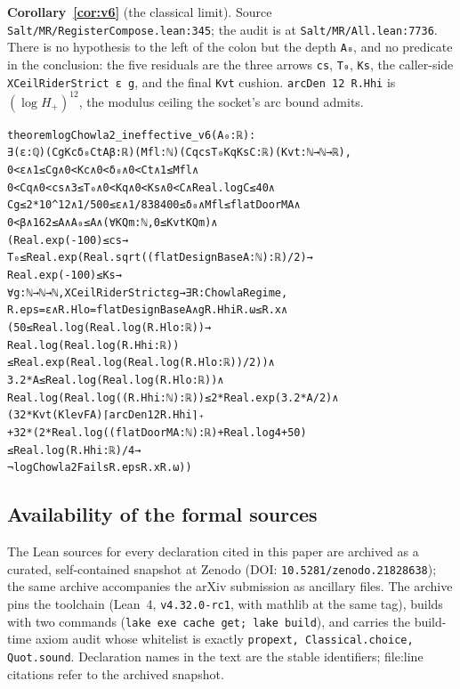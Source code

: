 \documentclass[11pt]{amsart}
\newcommand{\leaninline}[1]{{\small\texttt{#1}}}
\theoremstyle{remark}
\begin{document}
\medskip\noindent\textbf{Corollary~\ref{cor:v6}} (the classical limit). Source
\leaninline{Salt/\allowbreak MR/\allowbreak RegisterCompose.lean:345}; the audit is at
\leaninline{Salt/\allowbreak MR/\allowbreak All.lean:7736}. There is no hypothesis to the left of the
colon but the depth \leaninline{A₀}, and no predicate in the conclusion: the
five residuals are the three arrows \leaninline{cs}, \leaninline{T₀},
\leaninline{Ks}, the caller-side \leaninline{XCeilRiderStrict ε g}, and the
final \leaninline{Kvt} cushion. \leaninline{arcDen 12 R.Hhi} is
$(\log H_+)^{12}$, the modulus ceiling the socket's arc bound admits.
{\footnotesize\begin{alltt}
theorem logChowla2_ineffective_v6 (A₀ : ℝ) :
    ∃ (ε : ℚ) (Cg Kc δ₀ Ct A β : ℝ) (Mfl : ℕ) (Cq cs T₀ Kq Ks C : ℝ) (Kvt : ℕ → ℕ → ℝ),
      0 < ε ∧ 1 ≤ Cg ∧ 0 < Kc ∧ 0 < δ₀ ∧ 0 < Ct ∧ 1 ≤ Mfl ∧
      0 < Cq ∧ 0 < cs ∧ 3 ≤ T₀ ∧ 0 < Kq ∧ 0 < Ks ∧ 0 < C ∧ Real.log C ≤ 40 ∧
      Cg ≤ 2 * 10 ^ 12 ∧ 1 / 500 ≤ ε ∧ 1 / 838400 ≤ δ₀ ∧ Mfl ≤ flatDoorM A ∧
      0 < β ∧ 162 ≤ A ∧ A₀ ≤ A ∧ (∀ K Qm : ℕ, 0 ≤ Kvt K Qm) ∧
      (Real.exp (-100) ≤ cs →
        T₀ ≤ Real.exp (Real.sqrt ((flatDesignBase A : ℕ) : ℝ) / 2) →
        Real.exp (-100) ≤ Ks →
        ∀ g : ℕ → ℕ → ℕ, XCeilRiderStrict ε g → ∃ R : ChowlaRegime,
          R.eps = ε ∧ R.Hlo = flatDesignBase A ∧ g R.Hhi R.ω ≤ R.x ∧
          (50 ≤ Real.log (Real.log (R.Hlo : ℝ)) →
            Real.log (Real.log (R.Hhi : ℝ))
              ≤ Real.exp (Real.log (Real.log (R.Hlo : ℝ)) / 2)) ∧
          3.2 * A ≤ Real.log (Real.log (R.Hlo : ℝ)) ∧
          Real.log (Real.log ((R.Hhi : ℕ) : ℝ)) ≤ 2 * Real.exp (3.2 * A / 2) ∧
          (32 * Kvt (KlevF A) ⌈arcDen 12 R.Hhi⌉₊
              + 32 * (2 * Real.log ((flatDoorM A : ℕ) : ℝ) + Real.log 4 + 50)
            ≤ Real.log (R.Hhi : ℝ) / 4 →
            ¬ logChowla2Fails R.eps R.x R.ω))
\end{alltt}}

\subsection*{Availability of the formal sources}
The Lean sources for every declaration cited in this paper are
archived as a curated, self-contained snapshot at Zenodo
(DOI: \texttt{10.5281/zenodo.21828638}); the same archive accompanies the
arXiv submission as ancillary files. The archive pins the toolchain
(Lean~4, \texttt{v4.32.0-rc1}, with mathlib at the same tag), builds
with two commands (\texttt{lake exe cache get; lake build}), and
carries the build-time axiom audit whose whitelist is exactly
\leaninline{propext, Classical.choice, Quot.sound}. Declaration names
in the text are the stable identifiers; file:line citations refer to
the archived snapshot.
\end{document}
